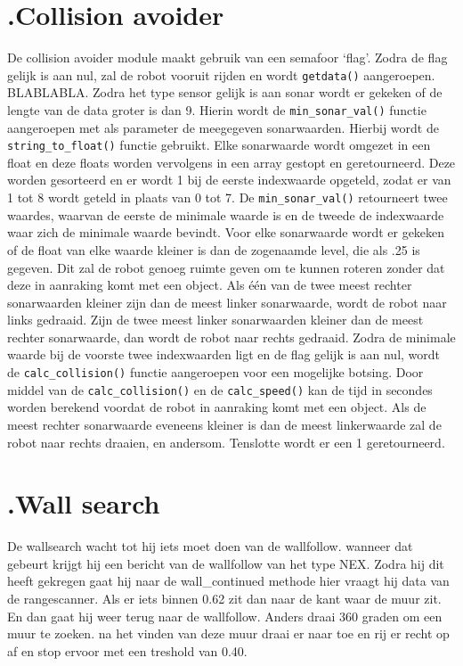 \documentclass[a4paper,10pt]{article}
\begin{document}
\section*{\label{collisionavoider}\thesection.\quad Collision avoider}
De collision avoider module maakt gebruik van een semafoor `flag'. Zodra de flag gelijk is aan nul, zal de robot vooruit rijden en wordt \verb!getdata()! aangeroepen. BLABLABLA. Zodra het type sensor gelijk is aan sonar wordt er gekeken of de lengte van de data groter is dan 9. Hierin wordt de \verb!min_sonar_val()! functie aangeroepen met als parameter de meegegeven sonarwaarden. Hierbij wordt de \verb!string_to_float()! functie gebruikt. Elke sonarwaarde wordt omgezet in een float en deze floats worden vervolgens in een array gestopt en geretourneerd. Deze worden gesorteerd en er wordt 1 bij de eerste indexwaarde opgeteld, zodat er van 1 tot 8 wordt geteld in plaats van 0 tot 7. De \verb!min_sonar_val()! retourneert twee waardes, waarvan de eerste de minimale waarde is en de tweede de indexwaarde waar zich de minimale waarde bevindt.
Voor elke sonarwaarde wordt er gekeken of de float van elke waarde kleiner is dan de zogenaamde level, die als .25 is gegeven. Dit zal de robot genoeg ruimte geven om te kunnen roteren zonder dat deze in aanraking komt met een object. Als \'{e}\'{e}n van de twee meest rechter sonarwaarden kleiner zijn dan de meest linker sonarwaarde, wordt de robot naar links gedraaid. Zijn de twee meest linker sonarwaarden kleiner dan de meest rechter sonarwaarde, dan wordt de robot naar rechts gedraaid. Zodra de minimale waarde bij de voorste twee indexwaarden ligt en de flag gelijk is aan nul, wordt de \verb!calc_collision()! functie aangeroepen voor een mogelijke botsing. Door middel van de \verb!calc_collision()! en de \verb!calc_speed()! kan de tijd in secondes worden berekend voordat de robot in aanraking komt met een object. Als de meest rechter sonarwaarde eveneens kleiner is dan de meest linkerwaarde zal de robot naar rechts draaien, en andersom. Tenslotte wordt er een 1 geretourneerd.

\section*{\label{wallsearch}\thesection.\quad Wall search}
De wallsearch wacht tot hij iets moet doen van de wallfollow. wanneer dat gebeurt krijgt hij een bericht van de wallfollow van het type NEX. Zodra hij dit heeft gekregen gaat hij naar de wall_continued methode hier vraagt hij data van de rangescanner. Als er iets binnen 0.62 zit dan naar de kant waar de muur zit. En dan gaat hij weer terug naar de wallfollow. Anders draai 360 graden om een muur te zoeken. na het vinden van deze muur draai er naar toe en rij er recht op af en stop ervoor met een treshold van 0.40.
\end{document}

